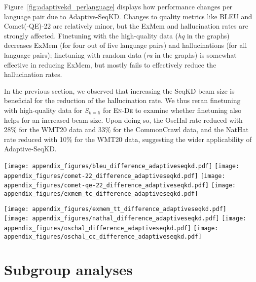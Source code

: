 Figure~\ref{fig:adaptivekd_perlanguage} displays how performance changes per language pair due to Adaptive-SeqKD. Changes to quality metrics like BLEU and Comet(-QE)-22 are relatively minor, but the ExMem and hallucination rates are strongly affected. Finetuning with the high-quality data (\textit{hq} in the graphs) decreases ExMem (for four out of five language pairs) and hallucinations (for all language pairs); finetuning with random data (\textit{ra} in the graphs) is somewhat effective in reducing ExMem, but mostly fails to effectively reduce the hallucination rates.

In the previous section, we observed that increasing the SeqKD beam size is beneficial for the reduction of the hallucination rate. We thus reran finetuning with high-quality data for $S_{k=5}$ for \textsc{En}-\textsc{De} to examine whether finetuning also helps for an increased beam size. Upon doing so, the OscHal rate reduced with 28\% for the WMT20 data and 33\% for the CommonCrawl data, and the NatHat rate reduced with 10\% for the WMT20 data, suggesting the wider applicability of Adaptive-SeqKD.

\begin{center}
\noindent \begin{minipage}{\textwidth}\begin{center}
    \texttt{[image: appendix\_figures/bleu\_difference\_adaptiveseqkd.pdf]}
    \texttt{[image: appendix\_figures/comet-22\_difference\_adaptiveseqkd.pdf]}
    \texttt{[image: appendix\_figures/comet-qe-22\_difference\_adaptiveseqkd.pdf]}
    \texttt{[image: appendix\_figures/exmem\_tc\_difference\_adaptiveseqkd.pdf]}

    \texttt{[image: appendix\_figures/exmem\_tt\_difference\_adaptiveseqkd.pdf]}
    \texttt{[image: appendix\_figures/nathal\_difference\_adaptiveseqkd.pdf]}
    \texttt{[image: appendix\_figures/oschal\_difference\_adaptiveseqkd.pdf]}
    \texttt{[image: appendix\_figures/oschal\_cc\_difference\_adaptiveseqkd.pdf]}
    \end{center}
    \label{fig:adaptivekd_perlanguage}
\end{minipage}
\end{center}


\section{Subgroup analyses}
\label{ap:subgroups}

